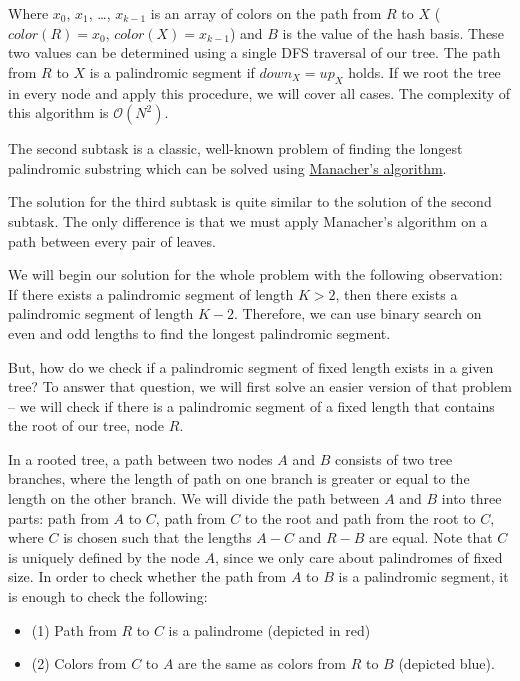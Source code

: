 \documentclass[a4paper]{article}
\begin{document}
Where $x_0$, $x_1$, \dots, $x_{k-1}$ is an array of colors on the path from
$R$ to $X$ ($color(R) = x_0$, $color(X) = x_{k-1}$) and $B$ is the value
of the hash basis. These two values can be determined using a single DFS
traversal of our tree. The path from $R$ to $X$ is a palindromic segment if
$down_X = up_X$ holds. If we root the tree in every node and apply this
procedure, we will cover all cases. The complexity of this algorithm is
$\mathcal{O}(N^2)$.

\clearpage

The second subtask is a classic, well-known problem of finding the longest
palindromic substring which can be solved using
\href{https://en.wikipedia.org/wiki/Longest_palindromic_substring}{Manacher's
algorithm}.

The solution for the third subtask is quite similar to the solution of the
second subtask. The only difference is that we must apply Manacher's algorithm
on a path between every pair of leaves.

We will begin our solution for the whole problem with the following observation:
If there exists a palindromic segment of length $K > 2$, then there exists a
palindromic segment of length $K - 2$. Therefore, we can use binary search on
even and odd lengths to find the longest palindromic segment.

But, how do we check if a palindromic segment of fixed length exists in a
given tree? To answer that question, we will first solve an easier version
of that problem -- we will check if there is a palindromic segment of a fixed
length that contains the root of our tree, node $R$.

In a rooted tree, a path between two nodes $A$ and $B$ consists of two
tree branches, where the length of path on one branch is greater or equal
to the length on the other branch. We will divide the path between $A$ and
$B$ into three parts: path from $A$ to $C$, path from $C$ to the root and path
from the root to $C$, where $C$ is chosen such that the lengths $A-C$ and $R-B$
are equal. Note that $C$ is uniquely defined by the node $A$, since we only care
about palindromes of fixed size. In order to check whether the path from $A$ to
$B$ is a palindromic segment, it is enough to check the following:

\begin{itemize}
  \item (1) Path from $R$ to $C$ is a palindrome (depicted in red)
  \item (2) Colors from $C$ to $A$ are the same as colors from $R$
    to $B$ (depicted blue).
\end{itemize}
\end{document}
